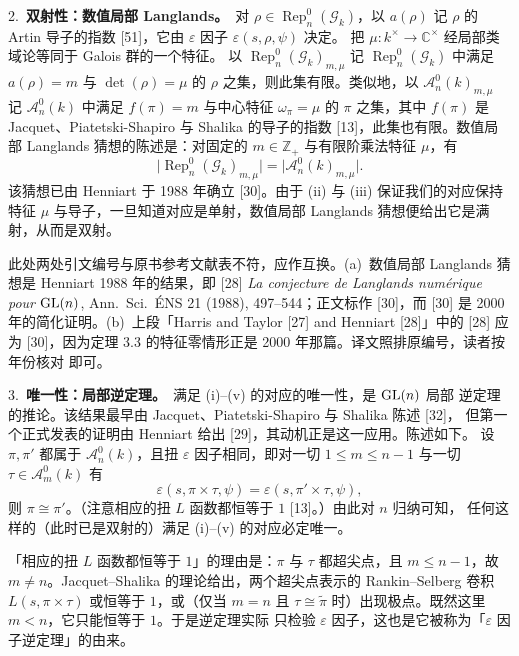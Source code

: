 2.~\textbf{双射性：数值局部 Langlands。}\ 对
$\rho\in\operatorname{Rep}_n^0(\mathcal{G}_k)$，以 $a(\rho)$ 记 $\rho$ 的
Artin 导子的指数 [51]，它由 $\varepsilon$ 因子 $\varepsilon(s,\rho,\psi)$ 决定。
把 $\mu\colon k^\times\to\mathbb{C}^\times$ 经局部类域论等同于 Galois 群的一个特征。
以 $\operatorname{Rep}_n^0(\mathcal{G}_k)_{m,\mu}$ 记
$\operatorname{Rep}_n^0(\mathcal{G}_k)$ 中满足 $a(\rho)=m$ 与
$\det(\rho)=\mu$ 的 $\rho$ 之集，则此集有限。类似地，以
$\mathcal{A}_n^0(k)_{m,\mu}$ 记 $\mathcal{A}_n^0(k)$ 中满足 $f(\pi)=m$ 与中心特征
$\omega_\pi=\mu$ 的 $\pi$ 之集，其中 $f(\pi)$ 是 Jacquet、Piatetski-Shapiro 与
Shalika 的导子的指数 [13]，此集也有限。数值局部 Langlands 猜想的陈述是：对固定的
$m\in\mathbb{Z}_+$ 与有限阶乘法特征 $\mu$，有
\[
  \bigl|\operatorname{Rep}_n^0(\mathcal{G}_k)_{m,\mu}\bigr|
  =\bigl|\mathcal{A}_n^0(k)_{m,\mu}\bigr|.
\]
该猜想已由 Henniart 于 1988 年确立 [30]。由于 (ii) 与 (iii) 保证我们的对应保持特征
$\mu$ 与导子，一旦知道对应是单射，数值局部 Langlands 猜想便给出它是满射，从而是双射。
\begin{annote}
此处两处引文编号与原书参考文献表不符，应作互换。(a)~数值局部 Langlands 猜想是
Henniart 1988 年的结果，即 [28] \textit{La conjecture de Langlands num\'erique
pour $\mathrm{GL}(n)$}, Ann.\ Sci.\ \'ENS 21 (1988), 497--544；正文标作 [30]，而 [30] 是
2000 年的简化证明。(b)~上段「Harris and Taylor [27] and Henniart [28]」中的 [28]
应为 [30]，因为定理 3.3 的特征零情形正是 2000 年那篇。译文照排原编号，读者按年份核对
即可。
\par\vspace{0.15em}{\raggedleft 【来源：原书参考文献表 [28]、[30]；Henniart, Invent.\ math.\ 139 (2000), 439--455（A）】\par}
\end{annote}

3.~\textbf{唯一性：局部逆定理。}\ 满足 (i)--(v) 的对应的唯一性，是 $\mathrm{GL}(n)$ 局部
逆定理的推论。该结果最早由 Jacquet、Piatetski-Shapiro 与 Shalika 陈述 [32]，
但第一个正式发表的证明由 Henniart 给出 [29]，其动机正是这一应用。陈述如下。
设 $\pi,\pi'$ 都属于 $\mathcal{A}_n^0(k)$，且扭 $\varepsilon$ 因子相同，即对一切
$1\le m\le n-1$ 与一切 $\tau\in\mathcal{A}_m^0(k)$ 有
\[
  \varepsilon(s,\pi\times\tau,\psi)=\varepsilon(s,\pi'\times\tau,\psi),
\]
则 $\pi\cong\pi'$。（注意相应的扭 $L$ 函数都恒等于 $1$ [13]。）由此对 $n$ 归纳可知，
任何这样的（此时已是双射的）满足 (i)--(v) 的对应必定唯一。
\begin{annote}
「相应的扭 $L$ 函数都恒等于 $1$」的理由是：$\pi$ 与 $\tau$ 都超尖点，且
$m\le n-1$，故 $m\neq n$。Jacquet--Shalika 的理论给出，两个超尖点表示的
Rankin--Selberg 卷积 $L(s,\pi\times\tau)$ 或恒等于 $1$，或（仅当 $m=n$ 且
$\tau\cong\tilde\pi$ 时）出现极点。既然这里 $m<n$，它只能恒等于 $1$。于是逆定理实际
只检验 $\varepsilon$ 因子，这也是它被称为「$\varepsilon$ 因子逆定理」的由来。
\par\vspace{0.15em}{\raggedleft 【来源：Jacquet--Piatetski-Shapiro--Shalika, C.~R.\ Acad.\ Sci.\ Paris 289 (1979), A59--A61；Cogdell, 本书第 9 章 \S4（A）】\par}
\end{annote}

